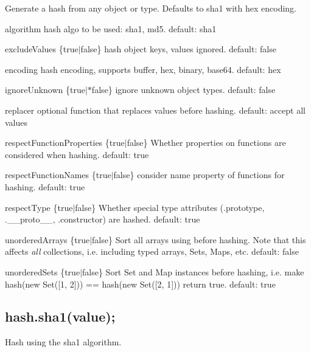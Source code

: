 Generate a hash from any object or type. Defaults to sha1 with hex encoding.
\begin{DoxyItemize}
\item {\ttfamily algorithm} hash algo to be used\+: \textquotesingle{}sha1\textquotesingle{}, \textquotesingle{}md5\textquotesingle{}. default\+: sha1
\item {\ttfamily exclude\+Values} \{true$\vert$false\} hash object keys, values ignored. default\+: false
\item {\ttfamily encoding} hash encoding, supports \textquotesingle{}buffer\textquotesingle{}, \textquotesingle{}hex\textquotesingle{}, \textquotesingle{}binary\textquotesingle{}, \textquotesingle{}base64\textquotesingle{}. default\+: hex
\item {\ttfamily ignore\+Unknown} \{true$\vert$$\ast$false\} ignore unknown object types. default\+: false
\item {\ttfamily replacer} optional function that replaces values before hashing. default\+: accept all values
\item {\ttfamily respect\+Function\+Properties} \{true$\vert$false\} Whether properties on functions are considered when hashing. default\+: true
\item {\ttfamily respect\+Function\+Names} \{true$\vert$false\} consider {\ttfamily name} property of functions for hashing. default\+: true
\item {\ttfamily respect\+Type} \{true$\vert$false\} Whether special type attributes ({\ttfamily .prototype}, {\ttfamily .\+\_\+\+\_\+proto\+\_\+\+\_\+}, {\ttfamily .constructor}) are hashed. default\+: true
\item {\ttfamily unordered\+Arrays} \{true$\vert$false\} Sort all arrays using before hashing. Note that this affects {\itshape all} collections, i.\+e. including typed arrays, Sets, Maps, etc. default\+: false
\item {\ttfamily unordered\+Sets} \{true$\vert$false\} Sort {\ttfamily Set} and {\ttfamily Map} instances before hashing, i.\+e. make {\ttfamily hash(new Set(\mbox{[}1, 2\mbox{]})) == hash(new Set(\mbox{[}2, 1\mbox{]}))} return {\ttfamily true}. default\+: true
\end{DoxyItemize}

\subsection*{hash.\+sha1(value);}

Hash using the sha1 algorithm.

